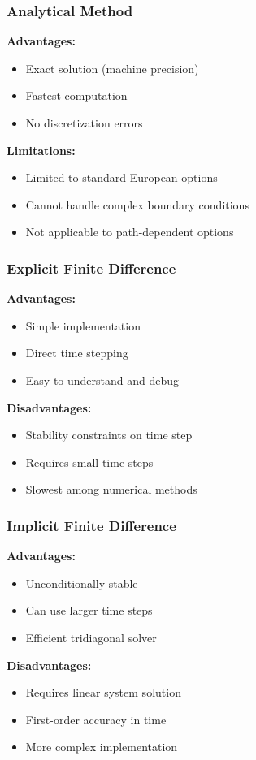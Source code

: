 \documentclass[12pt,a4paper]{article}
\numberwithin{algorithm}{subsection}
\begin{document}
\subsubsection{Analytical Method}
\textbf{Advantages:}
\begin{itemize}
\item Exact solution (machine precision)
\item Fastest computation
\item No discretization errors
\end{itemize}

\textbf{Limitations:}
\begin{itemize}
\item Limited to standard European options
\item Cannot handle complex boundary conditions
\item Not applicable to path-dependent options
\end{itemize}

\subsubsection{Explicit Finite Difference}
\textbf{Advantages:}
\begin{itemize}
\item Simple implementation
\item Direct time stepping
\item Easy to understand and debug
\end{itemize}

\textbf{Disadvantages:}
\begin{itemize}
\item Stability constraints on time step
\item Requires small time steps
\item Slowest among numerical methods
\end{itemize}

\subsubsection{Implicit Finite Difference}
\textbf{Advantages:}
\begin{itemize}
\item Unconditionally stable
\item Can use larger time steps
\item Efficient tridiagonal solver
\end{itemize}

\textbf{Disadvantages:}
\begin{itemize}
\item Requires linear system solution
\item First-order accuracy in time
\item More complex implementation
\end{itemize}
\end{document}
